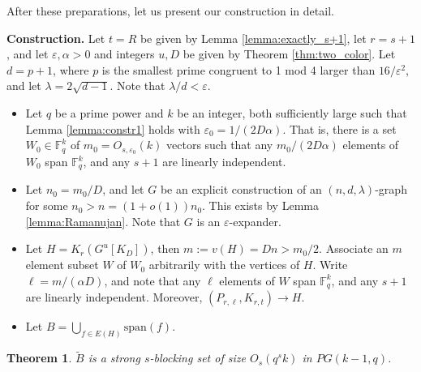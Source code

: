 \documentclass[11pt]{article}
\theoremstyle{plain}
\newtheorem{theorem}{Theorem}
\theoremstyle{definition}
\begin{document}
After these preparations, let us present our construction in detail.

\medskip

\noindent
    \textbf{Construction.} Let $t=R$ be given by Lemma \ref{lemma:exactly_s+1}, let $r=s+1$, and let $\varepsilon,\alpha>0$  and integers $u,D$ be given by Theorem \ref{thm:two_color}. Let $d=p+1$, where $p$ is the smallest prime congruent to 1 mod 4 larger than $16/\varepsilon^2$, and let $\lambda=2\sqrt{d-1}$. Note that $\lambda/d< \varepsilon$.

    \begin{itemize}
        \item  Let $q$ be a prime power and $k$ be an integer, both sufficiently large such that Lemma \ref{lemma:constr1} holds with $\varepsilon_0=1/(2D\alpha)$. That is, there is a set $W_0\in \mathbb{F}_q^k$ of $m_0=O_{s,\varepsilon_0}(k)$ vectors such that any $m_0/(2D\alpha)$ elements of $W_0$ span $\mathbb{F}_q^k$, and any $s+1$ are linearly independent. %

        \item Let $n_0=m_0/D$, and let $G$ be an explicit construction of an $(n, d,\lambda)$-graph for some $n_0>n=(1+o(1))n_0$. This exists by Lemma \ref{lemma:Ramanujan}. Note that $G$ is an $\varepsilon$-expander.

        \item Let $H=K_r(G^u[K_D])$, then $m:=v(H)=Dn>m_0/2$. Associate an $m$ element subset $W$ of $W_0$ arbitrarily with the vertices of $H$. Write $\ell=m/(\alpha D)$, and note that any $\ell$ elements of $W$ span $\mathbb{F}_q^k$, and any $s+1$ are linearly independent. Moreover, $(P_{r,\ell},K_{r,t})\rightarrow H$.
        
        \item Let $B=\bigcup_{f\in E(H)}\mbox{span}(f)$.
    \end{itemize}
    
 

\begin{theorem}
    $\tilde{B}$ is a strong $s$-blocking set of size $O_s(q^sk)$ in $PG(k-1,q)$.
\end{theorem}
\end{document}
